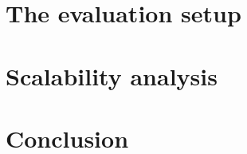 \documentclass[12pt, twoside]{book}
\begin{document}
    \chapter{The evaluation setup}
        

    \chapter{Scalability analysis}
        

    \chapter{Conclusion}
        
   
    \printindex

    \printbibliography[heading=bibintoc]
\end{document}
